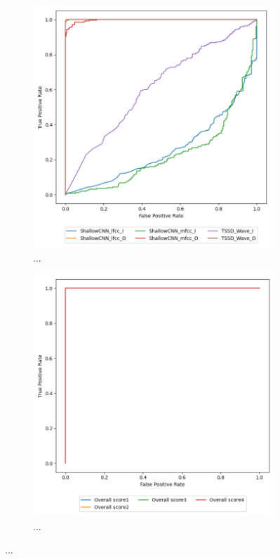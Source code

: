 \begin{figure}[H]
    \begin{subfigure}[h]{0.5\linewidth}
        \centering
        \includegraphics[width=1\linewidth]{other-fig/tests/lj_wf_methods.png}
        \caption{...}
    \end{subfigure}
    \hfill
    \begin{subfigure}[h]{0.5\linewidth}
        \centering
        \includegraphics[width=1\linewidth]{other-fig/tests/lj_wf_overall_score.png}
        \caption{...}
    \end{subfigure}
    \caption{...}
\end{figure}


